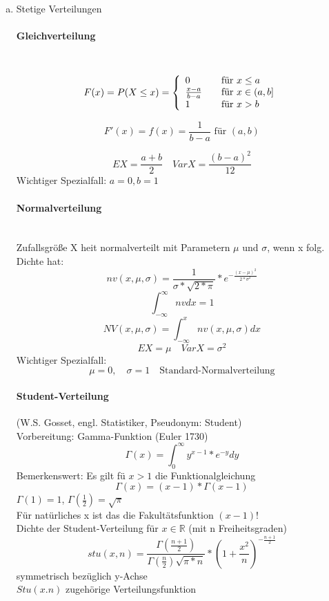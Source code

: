 \documentclass[a4paper,12pt]{scrartcl}
\begin{document}
\begin{enumerate}[(a)]
  \item Stetige Verteilungen\\
  \paragraph{Gleichverteilung}\quad\\
  
  $$F(x) = P(X\leq x) = \left\{ 
  \begin{array}{l l l}
    0 & \quad \text{für $x\leq a$}\\
    \frac{x-a}{b-a} & \quad \text{für $x \in (a,b]$}\\
    1 & \quad \text{für $x>b $} 
  \end{array} \right. $$
  
  $$F'(x) = f(x) = \frac{1}{b-a} \text{ für } (a,b) $$
  
  $$EX = \frac{a+b}{2}\quad VarX=\frac{(b-a)^2}{12}$$
  Wichtiger Spezialfall: $a=0,b=1$\\
  
  \paragraph{Normalverteilung}\quad\\
  Zufallsgröße X heit normalverteilt mit Parametern $\mu$ und $\sigma$, wenn x folg. Dichte hat:
  $$nv(x,\mu,\sigma) = \frac{1}{\sigma * \sqrt{2*\pi}}* e^{-\frac{(x-\mu)^2}{2*\sigma^2}}$$
  $$\int^\infty_{-\infty}nv dx = 1$$
  $$NV(x,\mu,\sigma) = \int^x_{-\infty}nv(x,\mu,\sigma)dx $$
  $$EX = \mu \quad VarX = \sigma^2$$
  Wichtiger Spezialfall:
  $$\mu=0,\quad \sigma=1\quad \text{Standard-Normalverteilung} $$
  
  \paragraph{Student-Verteilung} (W.S. Gosset, engl. Statistiker, Pseudonym: Student)\\
  Vorbereitung: Gamma-Funktion (Euler 1730)
  $$\Gamma(x) = \int_0^{\infty}y^{x-1}*e^{-y}dy$$
  Bemerkenswert: Es gilt fü $x>1$ die Funktionalgleichung
  $$\Gamma(x) = (x-1)*\Gamma(x-1) $$
  $\Gamma(1) = 1$, $\Gamma(\frac{1}{2})=\sqrt{\pi}$\\
  Für natürliches x ist das die Fakultätsfunktion $(x-1)$!\\
  Dichte der Student-Verteilung für $x\in\mathbb{R}$ (mit n Freiheitsgraden)
  $$stu(x,n) = \frac{\Gamma(\frac{n+1}{2})}{\Gamma(\frac{n}{2})\sqrt{\pi *n}}*(1+\frac{x^2}{n})^{-\frac{n+1}{2}} $$
  symmetrisch bezüglich y-Achse\\
  $Stu(x.n) $ zugehörige Verteilungsfunktion\\

\end{enumerate}
\end{document}
